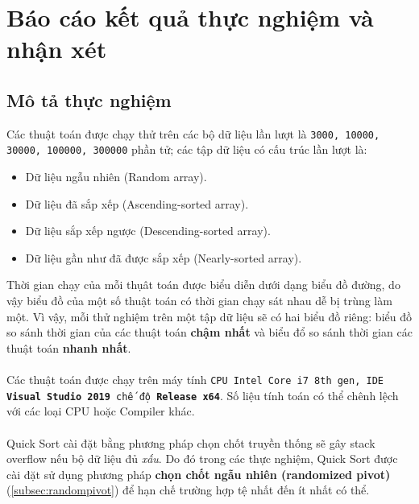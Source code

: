 \documentclass[]{article}
\begin{document}
\section{Báo cáo kết quả thực nghiệm và nhận xét}
\subsection{Mô tả thực nghiệm}
Các thuật toán được chạy thử trên các bộ dữ liệu lần lượt là \texttt{3000, 10000, 30000, 100000, 300000} phần tử; các tập dữ liệu có cấu trúc lần lượt là:
\begin{itemize}
\item Dữ liệu ngẫu nhiên (Random array).
\item Dữ liệu đã sắp xếp (Ascending-sorted array).
\item Dữ liệu sắp xếp ngược (Descending-sorted array).
\item Dữ liệu gần như đã được sắp xếp (Nearly-sorted array).
\end{itemize}
Thời gian chạy của mỗi thụât toán được biểu diễn dưới dạng biểu đồ đường, do vậy biểu đồ của một số thuật toán có thời gian chạy sát nhau dễ bị trùng làm một. Vì vậy, mỗi thử nghiệm trên một tập dữ liệu sẽ có hai biểu đồ riêng: biểu đồ so sánh thời gian của các thuật toán \textbf{chậm nhất} và biểu đổ so sánh thời gian các thuật toán \textbf{nhanh nhất}.
\\\\
Các thuật toán được chạy trên máy tính \texttt{CPU Intel Core i7 8th gen, IDE \textbf{Visual Studio 2019} chế độ \textbf{Release x64}}. Số liệu tính toán có thể chênh lệch với các loại CPU hoặc Compiler khác.
\\\\
Quick Sort cài đặt bằng phương pháp chọn chốt truyền thống sẽ gây stack overflow nếu bộ dữ liệu đủ \textit{xấu}. Do đó trong các thực nghiệm, Quick Sort được cài đặt sử dụng phương pháp \textbf{chọn chốt ngẫu nhiên (randomized pivot)} (\ref{subsec:randompivot}) để hạn chế trường hợp tệ nhất đến ít nhất có thể.
\end{document}
